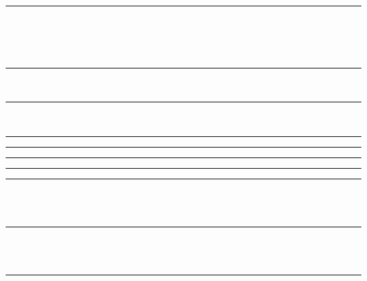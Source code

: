 \documentclass{article}
\begin{document}
\hrule
\begin{code}%
\>[0]\<%
\\
\>[0]\<%
\\
\>[0][@{}l@{\AgdaIndent{0}}]%
\>[2]\AgdaSpace{}%
\AgdaSymbol{:}\AgdaSpace{}%
\<%
\\
%
\>[2]\AgdaSpace{}%
\AgdaSymbol{:}\AgdaSpace{}%
\<%
\end{code}
\hrule
\begin{code}%
\>[0]\<%
\\
\>[0]\<%
\end{code}
\hrule
\begin{code}%
\>[0]\<%
\\
\>[0]\<%
\end{code}
\hrule
\begin{code}%
\>[0]\<%
\end{code}
\hrule
\begin{code}  %
\>[0]\<%
\end{code}
\hrule
  \begin{code}  %
\>[0]\<%
\end{code}
\hrule
  \begin{code}  %
\>[0]\<%
\end{code}
\hrule
\begin{code}%
\>[0]\AgdaSpace{}%
\AgdaModule{\_}\AgdaSpace{}%
\<%
\end{code}
\begin{code}%
\>[0]\<%
\\
\>[0][@{}l@{\AgdaIndent{1}}]%
\>[2]\<%
\\
\>[2][@{}l@{\AgdaIndent{0}}]%
\>[4]\AgdaSpace{}%
\AgdaSymbol{:}\AgdaSpace{}%
\<%
\end{code}
\hrule
\begin{AgdaAlign}
\begin{code}%
\>[0]\<%
\\
\>[0][@{}l@{\AgdaIndent{0}}]%
\>[2]%
\>[5]\AgdaSymbol{:}\AgdaSpace{}%
\AgdaSpace{}%
\AgdaSpace{}%
\<%
\\
%
\>[2]%
\>[5]\AgdaSymbol{:}%
\>[11I]\<%
\end{code}
\begin{code}%
\>[11I][@{}l@{\AgdaIndent{1}}]%
\>[10]\<%
\end{code}
\end{AgdaAlign}
\hrule
\end{document}
